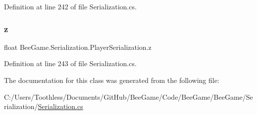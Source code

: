 Definition at line 242 of file Serialization.\+cs.

\mbox{\label{class_bee_game_1_1_serialization_1_1_player_serialization_a9836712a8e5f645bea8304e50fb84e51}} 
\subsubsection{\texorpdfstring{z}{z}}
{\footnotesize\ttfamily float Bee\+Game.\+Serialization.\+Player\+Serialization.\+z}



Definition at line 243 of file Serialization.\+cs.



The documentation for this class was generated from the following file\+:\begin{DoxyCompactItemize}
\item 
C\+:/\+Users/\+Toothless/\+Documents/\+Git\+Hub/\+Bee\+Game/\+Code/\+Bee\+Game/\+Bee\+Game/\+Serialization/\hyperlink{_serialization_8cs}{Serialization.\+cs}\end{DoxyCompactItemize}
